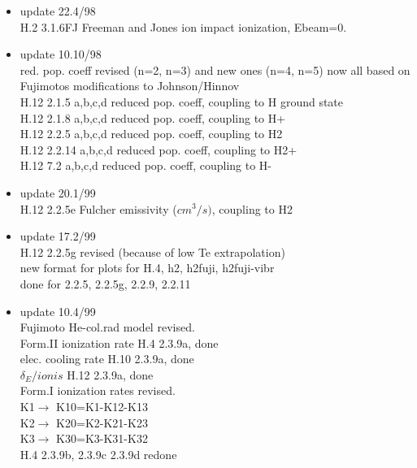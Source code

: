\documentclass[12pt,dvips]{article}
\begin{document}
\begin{itemize}
                   (=electron cooling rate)\\
  H.12 2.6A0 ADAS  carbon line radiation per ionization\\
  H.12 2.3.6A0 ADAS  carbon line radiation per recombination
 \item update   22.4/98 \\
  H.2  3.1.6FJ  Freeman and Jones ion impact ionization, Ebeam=0.
 \item update   10.10/98 \\
  red. pop. coeff revised (n=2, n=3) and new ones (n=4, n=5)
  now all based on Fujimotos modifications to Johnson/Hinnov\\
  H.12 2.1.5  a,b,c,d  reduced pop. coeff, coupling to H ground state\\
  H.12 2.1.8  a,b,c,d  reduced pop. coeff, coupling to H+\\
  H.12 2.2.5  a,b,c,d  reduced pop. coeff, coupling to H2\\
  H.12 2.2.14 a,b,c,d  reduced pop. coeff, coupling to H2+\\
  H.12 7.2    a,b,c,d  reduced pop. coeff, coupling to H-\\
 \item update   20.1/99 \\
  H.12 2.2.5e Fulcher emissivity ($cm^3/s)$, coupling to H2\\
 \item update   17.2/99 \\
  H.12 2.2.5g revised (because of low Te extrapolation)\\
  new format for plots for H.4,  h2, h2fuji, h2fuji-vibr \\
  done for 2.2.5, 2.2.5g, 2.2.9, 2.2.11
 \item update   10.4/99 \\
  Fujimoto He-col.rad model revised.\\
  Form.II      ionization rate          H.4  2.3.9a, done \\
               elec. cooling rate  H.10 2.3.9a, done \\
              $\delta_E/ionis$     H.12 2.3.9a, done \\
  Form.I ionization rates revised. \\
   K1$\rightarrow$ K10=K1-K12-K13 \\
   K2$\rightarrow$ K20=K2-K21-K23 \\
   K3$\rightarrow$ K30=K3-K31-K32 \\
               H.4 2.3.9b, 2.3.9c 2.3.9d  redone \\

\end{itemize}
\end{document}
